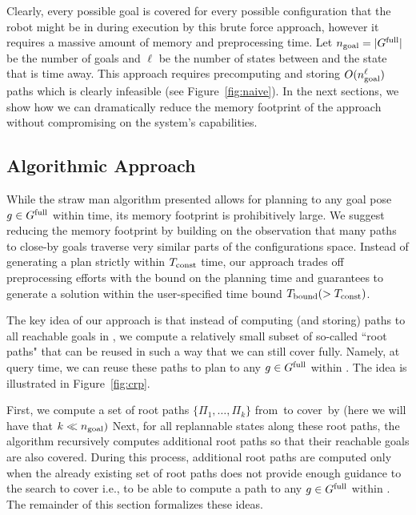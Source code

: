 \documentclass[a4paper]{report}
\begin{document}
Clearly, every possible goal is covered for every possible configuration that the robot might be in during execution by this brute force approach, however it requires a massive amount of memory and preprocessing time.
Let $n_{\rm goal} = \vert G^{\textrm{full}} \vert$ be the number of goals and
$\ell$ be the number of states between \Shome and the state that is \Trc time away.
This approach requires precomputing and storing $O(n_{\rm goal}^\ell)$ paths which is clearly infeasible (see Figure~\ref{fig:naive}).
In the next sections, we show how we can dramatically reduce the memory footprint of the approach without compromising on the system's capabilities.




\subsection{Algorithmic Approach}
While the straw man algorithm presented allows for planning to any goal pose $ g \in G^{\textrm{full}}$ within \Tconst time, its memory footprint is prohibitively large.
%
We suggest reducing the memory footprint by building on the observation that many paths to close-by goals traverse very similar parts of the configurations space. Instead of generating a plan strictly within $T_{\textrm{const}}$ time, our approach trades off preprocessing efforts with the bound on the planning time and guarantees to generate a solution within the user-specified time bound $T_{\textrm{bound}} (> T_{\textrm{const}})$.


The key idea of our approach is that instead of computing (and storing) paths to all reachable goals in \Gfull, we compute a relatively small subset of so-called ``root paths" that can be reused in such a way that we can still cover \Gfull fully. Namely, at query time, we can reuse these paths to plan to any $g\in G^{\textrm{full}}$ within \Tbound. The idea is illustrated in Figure~\ref{fig:crp}.


First, we compute a set of root paths $\{\Pi_1, \ldots, \Pi_k \}$ from~\Shome to cover~\Gfull by \Shome (here we will have that $k \ll n_{\rm goal})$ 
%
Next, for all replannable states along these root paths, the algorithm recursively computes additional root paths so that their reachable goals are also covered.
During this process, additional root paths are computed only when the already existing set of root paths does not provide enough guidance to the search to cover \Gfull i.e., to be able to compute a path to any $g \in G^{\textrm{full}}$ within \Tbound.
%
%
The remainder of this section formalizes these ideas.
\end{document}
